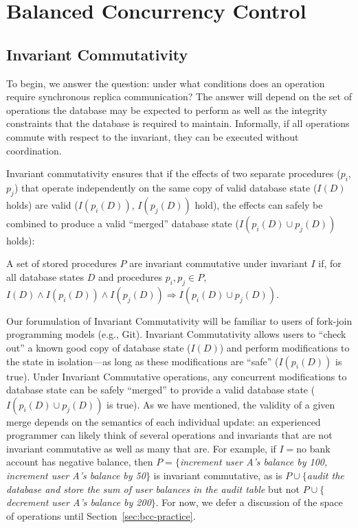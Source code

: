 
\section{Balanced Concurrency Control}
\label{sec:bcc-theory}

\subsection{Invariant Commutativity}

To begin, we answer the question: under what conditions does an
operation require synchronous replica communication? The answer will
depend on the set of operations the database may be expected to
perform as well as the integrity constraints that the database is
required to maintain. Informally, if all operations commute with
respect to the invariant, they can be executed without
coordination. 

Invariant commutativity ensures that if the effects of two separate
procedures ($p_i$, $p_j$) that operate independently on the same copy
of valid database state ($I(D)$ holds) are valid ($I(p_i(D))$,
$I(p_j(D))$ hold), the effects can safely be combined to produce a
valid ``merged'' database state ($I(p_i(D) \cup p_j(D))$ holds):

\begin{definition}
A set of stored procedures $P$ are invariant commutative under
invariant $I$ if, for all database states $D$ and procedures $p_i, p_j
\in P,$$ I(D) \wedge I(p_i(D)) \wedge I(p_j(D)) \Rightarrow I(p_i(D)
\cup p_j(D))$.
\end{definition}

Our forumulation of Invariant Commutativity will be familiar to users
of fork-join programming models (e.g., Git). Invariant Commutativity
allows users to ``check out'' a known good copy of database state
($I(D)$) and perform modifications to the state in isolation---as long
as these modifications are ``safe'' ($I(p_i(D))$ is true). Under
Invariant Commutative operations, any concurrent modifications to
database state can be safely ``merged'' to provide a valid database
state ($I(p_i(D) \cup p_j(D))$ is true). As we have mentioned, the
validity of a given merge depends on the semantics of each individual
update: an experienced programmer can likely think of several
operations and invariants that are not invariant commutative as well
as many that are. For example, if $I=$no bank account has negative
balance, then $P=\{$\textit{increment user A's balance by 100,
  increment user A's balance by 50}$\}$ is invariant commutative, as
is $P\cup\{$\textit{audit the database and store the sum of user
  balances in the \textrm{audit} table} but not
$P\cup\{$\textit{decrement user A's balance by 200}$\}$. For now, we
defer a discussion of the space of operations until
Section~\ref{sec:bcc-practice}.

